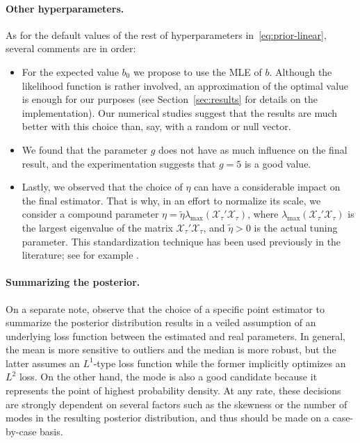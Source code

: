 \paragraph{Other hyperparameters.} As for the default values of the rest of hyperparameters in~\eqref{eq:prior-linear}, several comments are in order:
\begin{itemize}
  \item For the expected value \(b_0\) we propose to use the MLE of \(b\). Although the likelihood function is rather involved, an approximation of the optimal value is enough for our purposes (see Section~\ref{sec:results} for details on the implementation). Our numerical studies suggest that the results are much better with this choice than, say, with a random or null vector.
  \item We found that the parameter \(g\) does not have as much influence on the final result, and the experimentation suggests that \(g=5\) is a good value.
  \item Lastly, we observed that the choice of \(\eta\) can have a considerable impact on the final estimator. That is why, in an effort to normalize its scale, we consider a compound parameter \(\eta = \tilde \eta \lambda_{\max}(\mathcal X_\tau'\mathcal X_\tau)\), where \(\lambda_{\max}(\mathcal X_\tau'\mathcal X_\tau)\) is the largest eigenvalue of the matrix \(\mathcal X_\tau'\mathcal X_\tau\), and \(\tilde\eta > 0\) is the actual tuning parameter. This standardization technique has been used previously in the literature; see for example \citet{grollemund2019bayesian}.
\end{itemize}

\paragraph{Summarizing the posterior.} On a separate note, observe that the choice of a specific point estimator to summarize the posterior distribution results in a veiled assumption of an underlying loss function between the estimated and real parameters. In general, the mean is more sensitive to outliers and the median is more robust, but the latter assumes an \(L^1\)-type loss function while the former implicitly optimizes an \(L^2\) loss. On the other hand, the mode is also a good candidate because it represents the point of highest probability density. At any rate, these decisions are strongly dependent on several factors such as the skewness or the number of modes in the resulting posterior distribution, and thus should be made on a case-by-case basis. 

